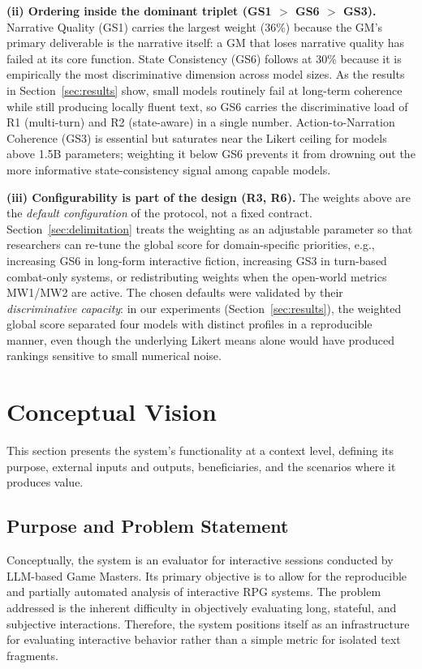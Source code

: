 \documentclass[12pt]{article}
\begin{document}
\textbf{(ii) Ordering inside the dominant triplet (GS1 $>$ GS6 $>$ GS3).} Narrative Quality (GS1) carries the largest weight (36\%) because the GM's primary deliverable is the narrative itself: a GM that loses narrative quality has failed at its core function. State Consistency (GS6) follows at 30\% because it is empirically the most discriminative dimension across model sizes. As the results in Section~\ref{sec:results} show, small models routinely fail at long-term coherence while still producing locally fluent text, so GS6 carries the discriminative load of R1 (multi-turn) and R2 (state-aware) in a single number. Action-to-Narration Coherence (GS3) is essential but saturates near the Likert ceiling for models above 1.5B parameters; weighting it below GS6 prevents it from drowning out the more informative state-consistency signal among capable models.

\textbf{(iii) Configurability is part of the design (R3, R6).} The weights above are the \textit{default configuration} of the protocol, not a fixed contract. Section~\ref{sec:delimitation} treats the weighting as an adjustable parameter so that researchers can re-tune the global score for domain-specific priorities, e.g., increasing GS6 in long-form interactive fiction, increasing GS3 in turn-based combat-only systems, or redistributing weights when the open-world metrics MW1/MW2 are active. The chosen defaults were validated by their \textit{discriminative capacity}: in our experiments (Section~\ref{sec:results}), the weighted global score separated four models with distinct profiles in a reproducible manner, even though the underlying Likert means alone would have produced rankings sensitive to small numerical noise.

\section{Conceptual Vision}
\label{sec:conceptual}

This section presents the system's functionality at a context level, defining its purpose, external inputs and outputs, beneficiaries, and the scenarios where it produces value.

\subsection{Purpose and Problem Statement}

Conceptually, the system is an evaluator for interactive sessions conducted by LLM-based Game Masters. Its primary objective is to allow for the reproducible and partially automated analysis of interactive RPG systems. The problem addressed is the inherent difficulty in objectively evaluating long, stateful, and subjective interactions. Therefore, the system positions itself as an infrastructure for evaluating interactive behavior rather than a simple metric for isolated text fragments.
\end{document}
